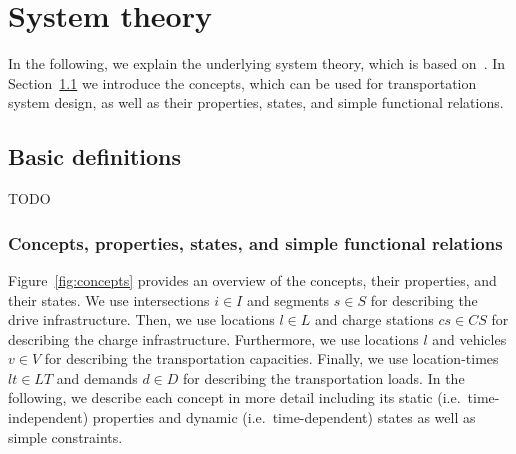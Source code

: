\documentclass[graybox]{svmult}
\begin{document}
\newpage

\section{System theory}

\label{sec:theory}
In the following, we explain the underlying system theory, which is based on~\cite{Ascher2014,Ascher2015,Ascher2016,Ascher2017}.
In Section~\ref{sec:concepts} we introduce the concepts, which can be used for transportation system design, as well as their properties, states, and simple functional relations.



\subsection{Basic definitions}
\label{sec:concepts}
TODO

\subsubsection{Concepts, properties, states, and simple functional relations}
Figure~\ref{fig:concepts} provides an overview of the concepts, their properties, and their states.
We use intersections $i \in I$ and segments $s \in S$ for describing the drive infrastructure.
Then, we use locations $l \in L$ and charge stations $cs \in CS$ for describing the charge infrastructure.
Furthermore, we use locations $l$ and vehicles $v \in V$ for describing the transportation capacities.
Finally, we use location-times $lt \in LT$ and demands $d \in D$ for describing the transportation loads.
In the following, we describe each concept in more detail including its static (i.e.\ time-independent) properties and dynamic (i.e.\ time-dependent) states as well as simple constraints.


\end{document}
